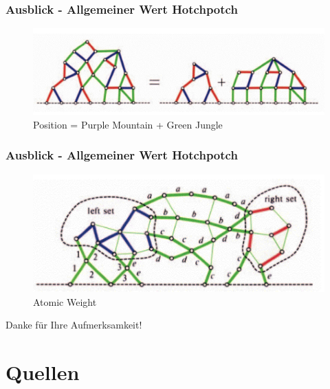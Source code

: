 \documentclass[12pt, aspectratio=169]{beamer}
\begin{document}
\begin{frame}
    \frametitle{Ausblick - Allgemeiner Wert Hotchpotch}
    \begin{figure}
        \includegraphics[width=\textwidth]{pic/purple-mountain2.png}
        \caption{Position = Purple Mountain + Green Jungle}
    \end{figure}
\end{frame}

\begin{frame}
    \frametitle{Ausblick - Allgemeiner Wert Hotchpotch}
    \begin{figure}
        \includegraphics[width=\textwidth]{pic/purple-mountian.png}
        \caption{Atomic Weight}
    \end{figure}
\end{frame}

\begin{frame}
    \centering
    \huge{Danke für Ihre Aufmerksamkeit!}
\end{frame}

\section{Quellen}
\begin{frame}
    \nocite{*}
	\hfill
    
    
\end{frame}
\end{document}
